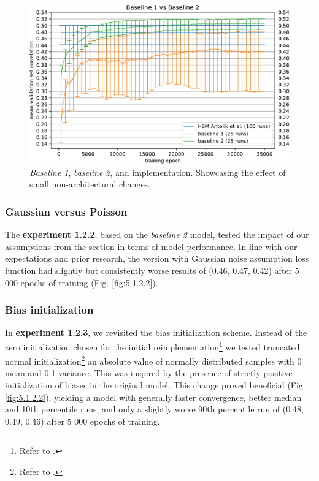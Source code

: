 \begin{figure}[H]
    \centering
    \includegraphics[width=1\textwidth]{../figures/05_1_2_1_2}
    \caption[Experiment 1.2.1 2]{\textit{Baseline 1}, \textit{baseline 2}, and \citeauthor{antolik} implementation\protect\footnotemark[9]. Showcasing the effect of small non-architectural changes.}
    \label{fig:5.1.2.1_2}
\end{figure}

\subsubsection{Gaussian versus Poisson}\label{ex:1.2.2}
The \textbf{experiment 1.2.2}, based on the \emph{baseline 2} model, tested the impact of our assumptions from the  section in terms of model performance. In line with our expectations and prior research, the version with Gaussian noise assumption loss function had slightly but consistently worse results of (0.46, 0.47, 0.42) after 5 000 epochs of training (Fig. \ref{fig:5.1.2.2}). 

\subsubsection{Bias initialization}\label{ex:1.2.3}

In \textbf{experiment 1.2.3}, we revisited the bias initialization scheme. Instead of the zero initialization chosen for the initial reimplementation\footnote{Refer to .} we tested truncated normal initialization\footnote{Refer to .} an absolute value of normally distributed samples with 0 mean and 0.1 variance. This was inspired by the presence of strictly positive initialization of biases in the original model. This change proved beneficial (Fig. \ref{fig:5.1.2.2}), yielding a model with generally faster convergence, better median and 10th percentile runs, and only a slightly worse 90th percentile run of (0.48, 0.49, 0.46) after 5 000 epochs of training.

